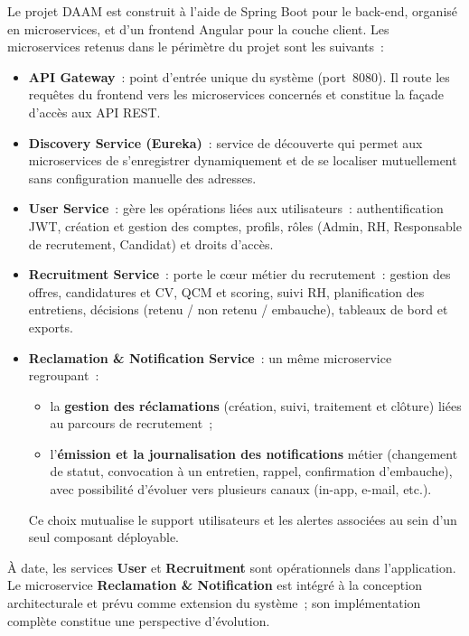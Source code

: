 Le projet DAAM est construit à l'aide de Spring Boot pour le back-end,
organisé en microservices, et d'un frontend Angular pour la couche client.
Les microservices retenus dans le périmètre du projet sont les suivants~:

\begin{itemize}
  \item \textbf{API Gateway}~: point d'entrée unique du système
        (port~8080). Il route les requêtes du frontend vers les
        microservices concernés et constitue la façade d'accès aux
        API REST.
  \item \textbf{Discovery Service (Eureka)}~: service de découverte qui
        permet aux microservices de s'enregistrer dynamiquement et de se
        localiser mutuellement sans configuration manuelle des adresses.
  \item \textbf{User Service}~: gère les opérations liées aux
        utilisateurs~: authentification JWT, création et gestion des
        comptes, profils, rôles (Admin, RH, Responsable de recrutement,
        Candidat) et droits d'accès.
  \item \textbf{Recruitment Service}~: porte le cœur métier du
        recrutement~: gestion des offres, candidatures et CV, QCM et
        scoring, suivi RH, planification des entretiens, décisions
        (retenu / non retenu / embauche), tableaux de bord et exports.
  \item \textbf{Reclamation \& Notification Service}~: un même
        microservice regroupant~:
        \begin{itemize}
          \item la \textbf{gestion des réclamations} (création, suivi,
                traitement et clôture) liées au parcours de recrutement~;
          \item l'\textbf{émission et la journalisation des notifications}
                métier (changement de statut, convocation à un entretien,
                rappel, confirmation d'embauche), avec possibilité
                d'évoluer vers plusieurs canaux (in-app, e-mail, etc.).
        \end{itemize}
        Ce choix mutualise le support utilisateurs et les alertes
        associées au sein d'un seul composant déployable.
\end{itemize}

À date, les services \textbf{User} et \textbf{Recruitment} sont opérationnels
dans l'application. Le microservice \textbf{Reclamation \& Notification}
est intégré à la conception architecturale et prévu comme extension du
système~; son implémentation complète constitue une perspective
d'évolution.


